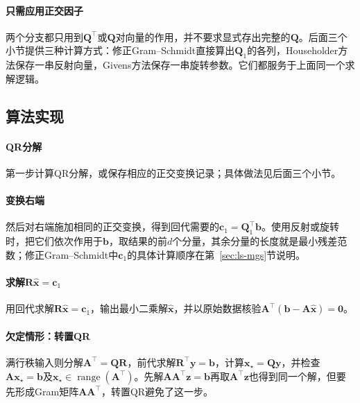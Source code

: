 \paragraph{只需应用正交因子}
两个分支都只用到$\bm Q^\top$或$\bm Q$对向量的作用，并不要求显式存出完整的$\bm Q$。后面三个小节提供三种计算方式：修正Gram--Schmidt直接算出$\bm Q_1$的各列，Householder方法保存一串反射向量，Givens方法保存一串旋转参数。它们都服务于上面同一个求解逻辑。

\subsection{算法实现}

\paragraph{QR分解}
第一步计算QR分解，或保存相应的正交变换记录；具体做法见后面三个小节。

\paragraph{变换右端}
然后对右端施加相同的正交变换，得到回代需要的$\bm c_1=\bm Q_1^\top\bm b$。使用反射或旋转时，把它们依次作用于$\bm b$，取结果的前$d$个分量，其余分量的长度就是最小残差范数；修正Gram--Schmidt中$\bm c_1$的具体计算顺序在第~\ref{sec:ls-mgs}节说明。

\paragraph{求解\texorpdfstring{$\bm R\hat{\bm x}=\bm c_1$}{Rx=c1}}
用回代求解$\bm R\hat{\bm x}=\bm c_1$，输出最小二乘解$\hat{\bm x}$，并以原始数据核验$\bm A^\top(\bm b-\bm A\hat{\bm x})=\bm0$。

\paragraph{欠定情形：转置QR}
满行秩输入则分解$\bm A^\top=\bm Q\bm R$，前代求解$\bm R^\top\bm y=\bm b$，计算$\bm x_\star=\bm Q\bm y$，并检查$\bm A\bm x_\star=\bm b$及$\bm x_\star\in\operatorname{range}(\bm A^\top)$。先解$\bm A\bm A^\top\bm z=\bm b$再取$\bm A^\top\bm z$也得到同一个解，但要先形成Gram矩阵$\bm A\bm A^\top$，转置QR避免了这一步。

